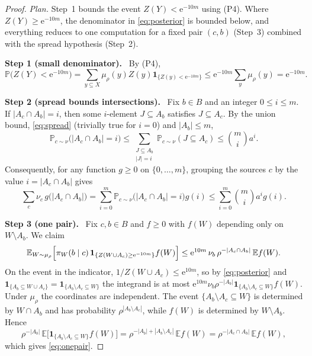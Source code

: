 \documentclass[11pt]{article}
\numberwithin{equation}{section}
\newcommand{\PP}{\mathbb P}
\newcommand{\EE}{\mathbb E}
\newcommand{\ind}{\mathbf 1}
\newcommand{\ee}{\mathrm e}
\newcommand{\step}[2]{\par\medskip\noindent\textbf{Step #1 (#2).}\ }
\begin{document}
\begin{proof}
\emph{Plan.} Step~1 bounds the event $Z(Y)<\ee^{-10m}$ using (P4).
Where $Z(Y)\ge\ee^{-10m}$, the denominator in \eqref{eq:posterior} is
bounded below, and everything reduces to one computation for a fixed
pair $(c,b)$ (Step~3) combined with the spread hypothesis (Step~2).

\step{1}{small denominator}
By (P4),
\begin{equation}\label{eq:small-denominator}
 \PP\bigl(Z(Y)<\ee^{-10m}\bigr)
 =\sum_{y\subseteq X}\mu_\rho(y)Z(y)\ind_{\{Z(y)<\ee^{-10m}\}}
 \le\ee^{-10m}\sum_y\mu_\rho(y)=\ee^{-10m}.
\end{equation}

\step{2}{spread bounds intersections}
Fix $b\in B$ and an integer $0\le i\le m$. If $|A_c\cap A_b|=i$, then
some $i$-element $J\subseteq A_b$ satisfies $J\subseteq A_c$. By the
union bound, \eqref{eq:spread} (trivially true for $i=0$) and
$|A_b|\le m$,
\begin{equation}\label{eq:intersection}
 \PP_{c\sim\nu}\bigl(|A_c\cap A_b|=i\bigr)
 \le\sum_{\substack{J\subseteq A_b\\|J|=i}}
        \PP_{c\sim\nu}(J\subseteq A_c)
 \le\binom mi a^i.
\end{equation}
Consequently, for any function $g\ge0$ on $\{0,\ldots,m\}$, grouping the
sources $c$ by the value $i=|A_c\cap A_b|$ gives
\begin{equation}\label{eq:grouping}
 \sum_c\nu_c\,g\bigl(|A_c\cap A_b|\bigr)
 =\sum_{i=0}^m\PP_{c\sim\nu}\bigl(|A_c\cap A_b|=i\bigr)g(i)
 \le\sum_{i=0}^m\binom mi a^i g(i).
\end{equation}

\step{3}{one pair}
Fix $c,b\in B$ and $f\ge0$ with $f(W)$ depending only on
$W\setminus A_b$. We claim
\begin{equation}\label{eq:onepair}
 \EE_{W\sim\mu_\rho}\Bigl[\pi_W(b\mid c)\,
   \ind_{\{Z(W\cup A_c)\ge\ee^{-10m}\}}f(W)\Bigr]
 \le\ee^{10m}\,\nu_b\,\rho^{-|A_c\cap A_b|}\,\EE f(W).
\end{equation}
On the event in the indicator, $1/Z(W\cup A_c)\le\ee^{10m}$, so by
\eqref{eq:posterior} and
$\ind_{\{A_b\subseteq W\cup A_c\}}=\ind_{\{A_b\setminus A_c\subseteq W\}}$
the integrand is at most
$\ee^{10m}\nu_b\rho^{-|A_b|}\ind_{\{A_b\setminus A_c\subseteq W\}}f(W)$.
Under $\mu_\rho$ the coordinates are independent. The event
$\{A_b\setminus A_c\subseteq W\}$ is determined by $W\cap A_b$ and has
probability $\rho^{|A_b\setminus A_c|}$, while $f(W)$ is determined by
$W\setminus A_b$. Hence
\[
 \rho^{-|A_b|}\,\EE\bigl[\ind_{\{A_b\setminus A_c\subseteq W\}}f(W)\bigr]
 =\rho^{-|A_b|+|A_b\setminus A_c|}\,\EE f(W)
 =\rho^{-|A_c\cap A_b|}\,\EE f(W),
\]
which gives \eqref{eq:onepair}.


\end{proof}
\end{document}
